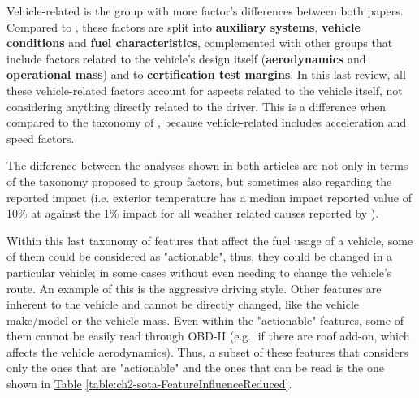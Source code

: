Vehicle-related is the group with more factor's differences between both papers. Compared to \parencite{zhou2016review}, these factors are split into \textbf{auxiliary systems}, \textbf{vehicle conditions} and \textbf{fuel characteristics}, complemented with other groups that include factors related to the vehicle's design itself (\textbf{aerodynamics} and \textbf{operational mass}) and to \textbf{certification test margins}. In this last review, all these vehicle-related factors account for aspects related to the vehicle itself, not considering anything directly related to the driver. This is a difference when compared to the taxonomy of \parencite{zhou2016review}, because vehicle-related includes acceleration and speed factors.

The difference between the analyses shown in both articles are not only in terms of the taxonomy proposed to group factors, but sometimes also regarding the reported impact (i.e. exterior temperature has a median impact reported value of 10\% at \parencite{zacharof2016review} against the 1\% impact for all weather related causes reported by \parencite{zhou2016review}).

Within this last taxonomy of features that affect the fuel usage of a vehicle, some of them could be considered as "actionable", thus, they could be changed in a particular vehicle; in some cases without even needing to change the vehicle's route. An example of this is the aggressive driving style. Other features are inherent to the vehicle and cannot be directly changed, like the vehicle make/model or the vehicle mass. Even within the "actionable" features, some of them cannot be easily read through OBD-II (e.g., if there are roof add-on, which affects the vehicle aerodynamics). Thus, a subset of these features that considers only the ones that are "actionable" and the ones that can be read is the one shown in \hyperref[table:ch2-sota-FeatureInfluenceReduced]{Table} \ref{table:ch2-sota-FeatureInfluenceReduced}.

